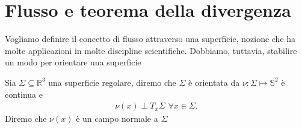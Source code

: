 \section{Flusso e teorema della divergenza}

Vogliamo definire il concetto di flusso attraverso una superficie, nozione che ha molte applicazioni in molte discipline scientifiche. Dobbiamo, tuttavia, stabilire un modo per orientare una superficie 
\begin{definition}
	Sia $\Sigma \subseteq \mathbb{R}^3$ una superficie regolare, diremo che $\Sigma$ è orientata da $\nu: \Sigma \mapsto \mathbb{S}^2$ è continua e 
	\begin{align*}
	\nu(x) \perp T_{x} \Sigma \, \, \forall x \in \Sigma.
	\end{align*}
	Diremo che $\nu(x)$ è un campo normale a $\Sigma$
\end{definition}

